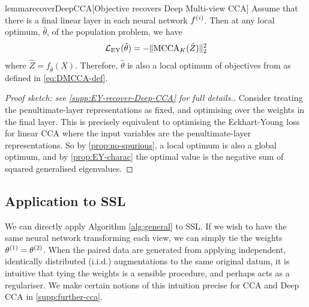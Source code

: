 \begin{restatable}{lemma}{recoverDeepCCA}[Objective recovers Deep Multi-view CCA]\label{lem:recover-DeepCCA}
Assume that there is a final linear layer in each neural network $f^{(i)}$.
Then at any local optimum, $\hat{\theta}$, of the population problem, we have
\begin{align*}
    \mathcal{L}_\text{EY}(\hat{\theta}) = - \lVert\operatorname{MCCA}_K(\hat{Z})\rVert_2^2
\end{align*}
where $\hat{Z} = f_{\hat{\theta}}(X)$.
Therefore, $\hat{\theta}$ is also a local optimum of objectives from \cite{andrew2013deep, somandepalli2019multimodal} as defined in \cref{eq:DMCCA-def}.
\end{restatable}
\begin{proof}[Proof sketch: see \cref{supp:EY-recover-Deep-CCA} for full details.]
    Consider treating the penultimate-layer representations as fixed, and optimising over the weights in the final layer. This is precisely equivalent to optimising the Eckhart-Young loss for linear CCA where the input variables are the penultimate-layer representations. So by \cref{prop:no-spurious}, a local optimum is also a global optimum, and by \cref{prop:EY-charac} the optimal value is the negative sum of squared generalised eigenvalues.
\end{proof}

\subsection{Application to SSL}
We can directly apply Algorithm \ref{alg:general} to SSL.
If we wish to have the same neural network transforming each view, we can simply tie the weights $\theta^{(1)} = \theta^{(2)}$.
When the paired data are generated from applying independent, identically distributed (i.i.d.) augmentations to the same original datum, it is intuitive that tying the weights is a sensible procedure, and perhaps acts as a regulariser.
We make certain notions of this intuition precise for CCA and Deep CCA in \cref{supp:further-cca}.

